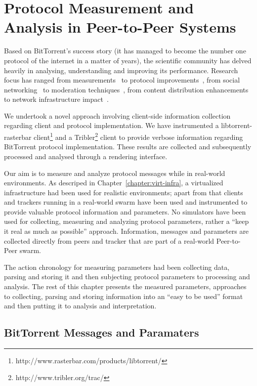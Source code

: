 
\chapter{Protocol Measurement and Analysis in Peer-to-Peer Systems}
\label{chapter:proto-measure}

Based on BitTorrent's success story (it has managed to become the number one
protocol of the internet in a matter of years), the scientific community has
delved heavily in analysing, understanding and improving its performance.
Research focus has ranged from measurements~\cite{measurement-study} to
protocol improvements~\cite{bt-impr}, from social
networking~\cite{tribler-social} to moderation
techniques~\cite{measurements-analysis}, from content distribution
enhancements~\cite{bitos} to network infrastructure impact~\cite{bt-impact}.

We undertook a novel approach involving client-side information collection
regarding client and protocol implementation. We have instrumented a
libtorrent-rasterbar
client\footnote{http://www.rasterbar.com/products/libtorrent/} and a
Tribler\footnote{http://www.tribler.org/trac/} client to provide verbose
information regarding BitTorrent protocol implementation. These results are
collected and subsequently processed and analysed through a rendering
interface.

Our aim is to measure and analyze protocol messages while in real-world
environments. As descriped in Chapter~\ref{chapter:virt-infra}, a virtualized
infrastructure had been used for realistic environments; apart from that
clients and trackers running in a real-world swarm have been used and
instrumented to provide valuable protocol information and parameters. No
simulators have been used for collecting, measuring and analyzing protocol
parameters, rather a ``keep it real as much as possible'' approach.
Information, messages and parameters are collected directly from peers and
tracker that are part of a real-world Peer-to-Peer swarm.

The action chronology for measuring parameters had been collecting data,
parsing and storing it and then subjecting protocol parameters to processing
and analysis. The rest of this chapter presents the measured parameters,
approaches to collecting, parsing and storing information into an ``easy to be
used'' format and then putting it to analysis and interpretation.

\section{BitTorrent Messages and Paramaters}
\label{sec:proto-measure:protocol-messages}

